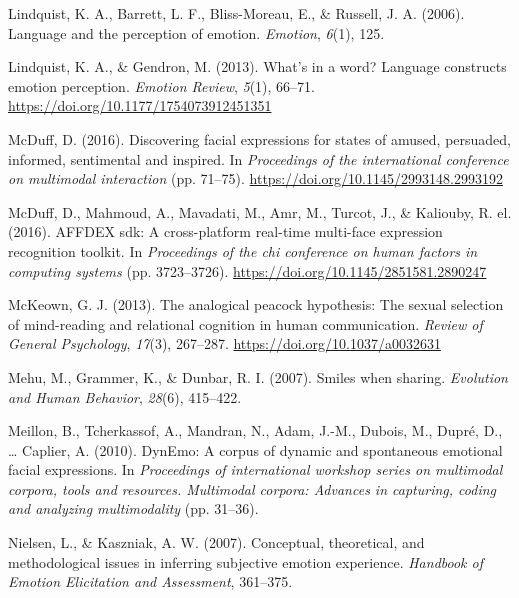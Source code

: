 \documentclass[man]{apa6}
\begin{document}
\leavevmode\hypertarget{ref-lindquist2006language}{}%
Lindquist, K. A., Barrett, L. F., Bliss-Moreau, E., \& Russell, J. A. (2006). Language and the perception of emotion. \emph{Emotion}, \emph{6}(1), 125.

\leavevmode\hypertarget{ref-lindquist2013s}{}%
Lindquist, K. A., \& Gendron, M. (2013). What's in a word? Language constructs emotion perception. \emph{Emotion Review}, \emph{5}(1), 66--71. \url{https://doi.org/10.1177/1754073912451351}

\leavevmode\hypertarget{ref-mcduff2016discovering}{}%
McDuff, D. (2016). Discovering facial expressions for states of amused, persuaded, informed, sentimental and inspired. In \emph{Proceedings of the international conference on multimodal interaction} (pp. 71--75). \url{https://doi.org/10.1145/2993148.2993192}

\leavevmode\hypertarget{ref-mcduff2016affdex}{}%
McDuff, D., Mahmoud, A., Mavadati, M., Amr, M., Turcot, J., \& Kaliouby, R. el. (2016). AFFDEX sdk: A cross-platform real-time multi-face expression recognition toolkit. In \emph{Proceedings of the chi conference on human factors in computing systems} (pp. 3723--3726). \url{https://doi.org/10.1145/2851581.2890247}

\leavevmode\hypertarget{ref-mckeown2013analogical}{}%
McKeown, G. J. (2013). The analogical peacock hypothesis: The sexual selection of mind-reading and relational cognition in human communication. \emph{Review of General Psychology}, \emph{17}(3), 267--287. \url{https://doi.org/10.1037/a0032631}

\leavevmode\hypertarget{ref-mehu2007smiles}{}%
Mehu, M., Grammer, K., \& Dunbar, R. I. (2007). Smiles when sharing. \emph{Evolution and Human Behavior}, \emph{28}(6), 415--422.

\leavevmode\hypertarget{ref-meillon2010dynemo}{}%
Meillon, B., Tcherkassof, A., Mandran, N., Adam, J.-M., Dubois, M., Dupré, D., \ldots{} Caplier, A. (2010). DynEmo: A corpus of dynamic and spontaneous emotional facial expressions. In \emph{Proceedings of international workshop series on multimodal corpora, tools and resources. Multimodal corpora: Advances in capturing, coding and analyzing multimodality} (pp. 31--36).

\leavevmode\hypertarget{ref-nielsen2007conceptual}{}%
Nielsen, L., \& Kaszniak, A. W. (2007). Conceptual, theoretical, and methodological issues in inferring subjective emotion experience. \emph{Handbook of Emotion Elicitation and Assessment}, 361--375.
\end{document}

